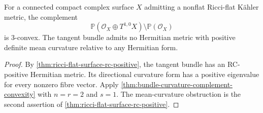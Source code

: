 \begin{corollary}\label{cor:ricci-flat-tangent-complement-convexity}
For a connected compact complex surface $X$ admitting a nonflat Ricci-flat K\"ahler metric, the complement
\[
 \mathbb P(\mathcal O_X\oplus T^{1,0}X)\setminus\mathbb P(\mathcal O_X)
\]
is $3$-convex. The tangent bundle admits no Hermitian metric with positive definite mean curvature relative to any Hermitian form.
\end{corollary}
\begin{proof}
By \cref{thm:ricci-flat-surface-rc-positive}, the tangent bundle has an RC-positive Hermitian metric. Its directional curvature form has a positive eigenvalue for every nonzero fibre vector. Apply \cref{thm:bundle-curvature-complement-convexity} with $n=r=2$ and $s=1$. The mean-curvature obstruction is the second assertion of \cref{thm:ricci-flat-surface-rc-positive}.
\end{proof}
